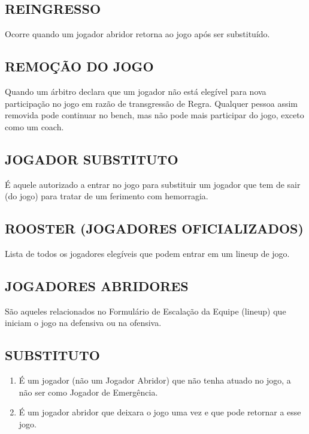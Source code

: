 \subsection{REINGRESSO}

Ocorre quando um jogador abridor retorna ao jogo após ser substituído.
\subsection{REMOÇÃO DO JOGO}

Quando um árbitro declara que um jogador não está elegível para nova  participação no jogo em razão de transgressão de Regra. Qualquer pessoa  assim removida pode continuar no \gls{bench}, mas não pode mais participar do jogo, exceto como um \gls{coach}.
\subsection{JOGADOR SUBSTITUTO}

É aquele autorizado a entrar no jogo para substituir um jogador que tem de sair (do jogo) para tratar de um ferimento com hemorragia.

\subsection{ROOSTER (JOGADORES OFICIALIZADOS)}
\begin{mdframed}[hidealllines=true,backgroundcolor=blue!20]
	Lista de todos os jogadores elegíveis que podem entrar em um \gls{lineup} de jogo.
\end{mdframed}

\subsection{JOGADORES ABRIDORES}
São aqueles relacionados no Formulário de Escalação da Equipe (\gls{lineup}) que iniciam o jogo na defensiva ou na ofensiva.

\subsection{SUBSTITUTO}

\begin{enumerate}[label=(\alph*)]
	\item É um jogador (não um Jogador Abridor) que não tenha atuado no jogo, a não ser como Jogador de Emergência.
	\item É um jogador abridor que deixara o jogo uma vez e que pode retornar a esse  jogo.
\end{enumerate}

